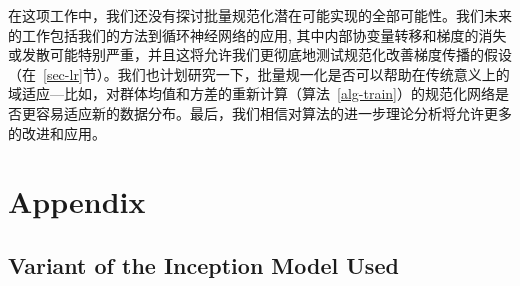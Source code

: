 \documentclass[twocolumn]{article}
\begin{document}
在这项工作中，我们还没有探讨批量规范化潜在可能实现的全部可能性。我们未来的工作包括我们的方法到循环神经网络的应用\cite{pascanu-rnn}, 其中内部协变量转移和梯度的消失或发散可能特别严重，并且这将允许我们更彻底地测试规范化改善梯度传播的假设（在~\ref{sec-lr}节）。我们也计划研究一下，批量规一化是否可以帮助在传统意义上的域适应—比如，对群体均值和方差的重新计算（算法~\ref{alg-train}）的规范化网络是否更容易适应新的数据分布。最后，我们相信对算法的进一步理论分析将允许更多的改进和应用。





\section*{Appendix}
\subsection*{Variant of the Inception Model Used}
\end{document}
